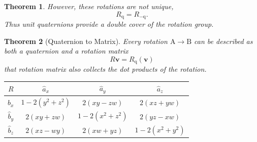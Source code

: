\documentclass{amsart}
\newtheorem{theorem}{Theorem}[section]
\theoremstyle{definition}
\theoremstyle{remark}
\numberwithin{equation}{section}
\begin{document}
\begin{theorem}
  However, these rotations are not unique,
  \begin{equation}
    R_\mathrm{q} = R_{-\mathrm{q}}.
  \end{equation}
  Thus unit quaternions provide a double cover of the rotation group.
\end{theorem}

\begin{theorem}[Quaternion to Matrix]
  Every rotation $\mathrm{A}\to\mathrm{B}$ can be described as both a quaternion and a rotation matrix
  \begin{equation}
    R\mathbf{v} = R_\mathrm{q} \left(\mathbf{v}\right)
  \end{equation}
  that rotation matrix also collects the dot products of the rotation.
  
  \begin{tabular}{c|ccc}
    $R$ & $\hat{a}_x$ & $\hat{a}_y$ & $\hat{a}_z$ \\
    \hline
    $\hat{b}_x$ & $1-2(y^2+z^2)$ & $2(xy-zw)$ & $2(xz+yw)$ \\
    $\hat{b}_y$ & $2(xy+zw)$ & $1-2(x^2+z^2)$ & $2(yz-xw)$ \\
    $\hat{b}_z$ & $2(xz-wy)$ & $2(xw+yz)$ & $1-2(x^2+y^2)$
  \end{tabular}\centering
\end{theorem}
\end{document}
